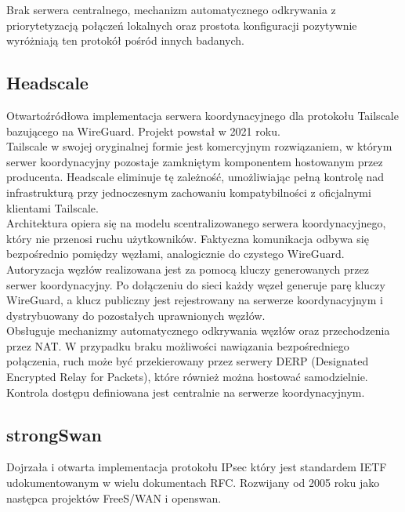 Brak serwera centralnego, mechanizm automatycznego odkrywania z priorytetyzacją połączeń lokalnych oraz prostota konfiguracji pozytywnie wyróżniają ten protokół pośród innych badanych.

\newpage
\subsection{Headscale}

Otwartoźródłowa implementacja serwera koordynacyjnego dla protokołu Tailscale bazującego na WireGuard. Projekt powstał w 2021 roku.\\

Tailscale w swojej oryginalnej formie jest komercyjnym rozwiązaniem, w którym serwer koordynacyjny pozostaje zamkniętym komponentem hostowanym przez producenta. Headscale eliminuje tę zależność, umożliwiając pełną kontrolę nad infrastrukturą przy jednoczesnym zachowaniu kompatybilności z oficjalnymi klientami Tailscale.\\

Architektura opiera się na modelu scentralizowanego serwera koordynacyjnego, który nie przenosi ruchu użytkowników. Faktyczna komunikacja odbywa się bezpośrednio pomiędzy węzłami, analogicznie do czystego WireGuard.\\

Autoryzacja węzłów realizowana jest za pomocą kluczy generowanych przez serwer koordynacyjny. Po dołączeniu do sieci każdy węzeł generuje parę kluczy WireGuard, a klucz publiczny jest rejestrowany na serwerze koordynacyjnym i dystrybuowany do pozostałych uprawnionych węzłów.\\

Obsługuje mechanizmy automatycznego odkrywania węzłów oraz przechodzenia przez NAT. W przypadku braku możliwości nawiązania bezpośredniego połączenia, ruch może być przekierowany przez serwery DERP (Designated Encrypted Relay for Packets), które również można hostować samodzielnie.\\

Kontrola dostępu definiowana jest centralnie na serwerze koordynacyjnym.\\

\newpage
\subsection{strongSwan}

Dojrzała i otwarta implementacja protokołu IPsec który jest standardem IETF udokumentowanym w wielu dokumentach RFC. Rozwijany od 2005 roku jako następca projektów FreeS/WAN i openswan.\\

